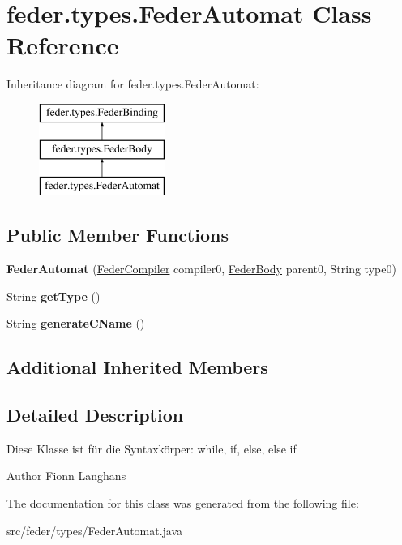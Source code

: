 \hypertarget{classfeder_1_1types_1_1FederAutomat}{}\section{feder.\+types.\+Feder\+Automat Class Reference}
\label{classfeder_1_1types_1_1FederAutomat}
Inheritance diagram for feder.\+types.\+Feder\+Automat\+:\begin{figure}[H]
\begin{center}
\leavevmode
\includegraphics[height=3.000000cm]{classfeder_1_1types_1_1FederAutomat}
\end{center}
\end{figure}
\subsection*{Public Member Functions}
\begin{DoxyCompactItemize}
\item 
\mbox{\label{classfeder_1_1types_1_1FederAutomat_ae6a34e03f15ff7621320cd013afd27fa}} 
{\bfseries Feder\+Automat} (\hyperlink{classfeder_1_1FederCompiler}{Feder\+Compiler} compiler0, \hyperlink{classfeder_1_1types_1_1FederBody}{Feder\+Body} parent0, String type0)
\item 
\mbox{\label{classfeder_1_1types_1_1FederAutomat_ab413cf26cfaaa6e2911786ace424aa29}} 
String {\bfseries get\+Type} ()
\item 
\mbox{\label{classfeder_1_1types_1_1FederAutomat_a38830b199a268b46fd7c11fe065e7fbf}} 
String {\bfseries generate\+C\+Name} ()
\end{DoxyCompactItemize}
\subsection*{Additional Inherited Members}


\subsection{Detailed Description}
Diese Klasse ist für die Syntaxkörper\+: while, if, else, else if

\begin{DoxyAuthor}{Author}
Fionn Langhans 
\end{DoxyAuthor}


The documentation for this class was generated from the following file\+:\begin{DoxyCompactItemize}
\item 
src/feder/types/Feder\+Automat.\+java\end{DoxyCompactItemize}
